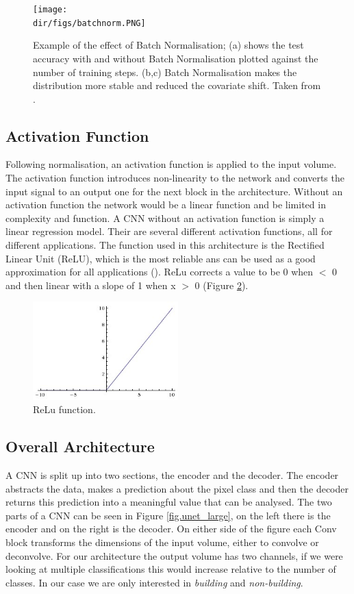\begin{figure}[htpb]
    \centering
    \texttt{[image: \\dir/figs/batchnorm.PNG]}
    \caption[Example of the effect of Batch Normalisation]{Example of the effect of Batch Normalisation; (a) shows the test accuracy with and without Batch Normalisation plotted against the number of training steps. (b,c) Batch Normalisation makes the distribution more stable and reduced the covariate shift. Taken from \citet{ioffe15}.}
    \label{fig.batchnorm}
\end{figure}
\subsection{Activation Function}
Following normalisation, an activation function is applied to the input volume. The activation function introduces non-linearity to the network and converts the input signal to an output one for the next block in the architecture. Without an activation function the network would be a linear function and be limited in complexity and function. A CNN without an activation function is simply a linear regression model. Their are several different activation functions, all for different applications. The function used in this architecture is the Rectified Linear Unit (ReLU), which is the most reliable ans can be used as a good approximation for all applications (\cite{krizhevsky17}). ReLu corrects a value to be 0 when $<$ 0 and then linear with a slope of 1 when x $>$ 0 (Figure \ref{fig.reluA}). 
\par

\begin{figure}[htpb]
    \centering
    \includegraphics[width=0.5\textwidth]{Part2/chapter3/chapter/figs/relu.jpeg}
    \caption{ReLu function.}
    \label{fig.reluA}
\end{figure}
\subsection{Overall Architecture}
A CNN is split up into two sections, the encoder and the decoder. The encoder abstracts the data, makes a prediction about the pixel class and then the decoder returns this prediction into a meaningful value that can be analysed. The two parts of a CNN can be seen in Figure \ref{fig.unet_large}, on the left there is the encoder and on the right is the decoder. On either side of the figure each Conv block transforms the dimensions of the input volume, either to convolve or deconvolve. For our architecture the output volume has two channels, if we were looking at multiple classifications this would increase relative to the number of classes. In our case we are only interested in \textit{building} and \textit{non-building}. 

